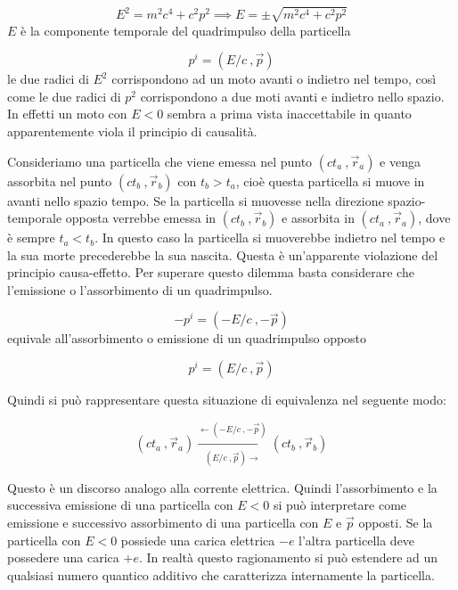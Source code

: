 \begin{equation*}
E^2 = m^2 c^4 + c^2 p^2 \implies E = \pm \sqrt{m^2 c^4 + c^2 p^2}
\end{equation*}
$E$ è la componente temporale del quadrimpulso della particella

\begin{equation*}
p^i = (E/c \ , \vec{p})
\end{equation*}
le due radici di $E^2$ corrispondono ad un moto avanti o indietro nel tempo,
così come le due radici di $p^2$ corrispondono a due moti avanti e indietro
nello spazio. In effetti un moto con $E < 0$ sembra a prima vista inaccettabile
in quanto apparentemente viola il principio di causalità.

Consideriamo una particella che viene emessa nel punto $(c t_a \ , \vec{r}_a)$ e
venga assorbita nel punto $(c t_b \ , \vec{r}_b )$ con $t_b > t_a$, cioè questa
particella si muove in avanti nello spazio tempo. Se la particella si muovesse
nella direzione spazio-temporale opposta verrebbe emessa in $(c t_b \ ,
\vec{r}_b)$ e assorbita in $(c t_a \ , \vec{r}_a)$, dove è sempre $t_a < t_b$.
In questo caso la particella si muoverebbe indietro nel tempo e la sua morte
precederebbe la sua nascita. Questa è un'apparente violazione del principio
causa-effetto. Per superare questo dilemma basta considerare che l'emissione o
l'assorbimento di un quadrimpulso.

\begin{equation*}
- p^i = (- E/c \ , - \vec{p})
\end{equation*}
equivale all'assorbimento o emissione di un quadrimpulso opposto

\begin{equation*}
p^i = ( E/c \ , \vec{p})
\end{equation*}

Quindi si può rappresentare questa situazione di equivalenza nel seguente modo:

\begin{equation*}
(c t_a \ , \vec{r}_a) \xrightarrow[(E/c \ , \vec{p}) \to ]{\gets (-E/c \ , - \vec{p})} (c t_b \ , \vec{r}_b)
\end{equation*}

Questo è un discorso analogo alla corrente elettrica. Quindi l'assorbimento e la
successiva emissione di una particella con $E < 0$ si può interpretare come
emissione e successivo assorbimento di una particella con $E$ e $\vec{p}$
opposti. Se la particella con $E < 0$ possiede una carica elettrica $-e$ l'altra
particella deve possedere una carica $+e$. In realtà questo ragionamento si può
estendere ad un qualsiasi numero quantico additivo che caratterizza internamente
la particella.

